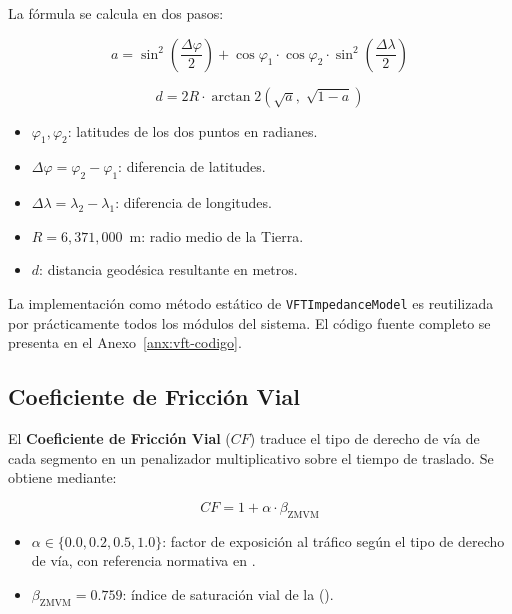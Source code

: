 La fórmula se calcula en dos pasos:

\begin{equation}
    a = \sin^{2}\!\left(\frac{\Delta\varphi}{2}\right)
        + \cos\varphi_1 \cdot \cos\varphi_2
          \cdot \sin^{2}\!\left(\frac{\Delta\lambda}{2}\right)
    \label{eq:haversine-a}
\end{equation}

\begin{equation}
    d = 2R \cdot \arctan2\!\left(\sqrt{a},\;\sqrt{1-a}\right)
    \label{eq:haversine-d}
\end{equation}

\begin{itemize}
    \item $\varphi_1, \varphi_2$: latitudes de los dos puntos en radianes.
    \item $\Delta\varphi = \varphi_2 - \varphi_1$: diferencia de latitudes.
    \item $\Delta\lambda = \lambda_2 - \lambda_1$: diferencia de longitudes.
    \item $R = 6{,}371{,}000$~m: radio medio de la Tierra.
    \item $d$: distancia geodésica resultante en metros.
\end{itemize}

La implementación como método estático de \texttt{VFTImpedanceModel} es reutilizada por prácticamente todos los módulos del sistema. El código fuente completo se presenta en el Anexo~\ref{anx:vft-codigo}.

\subsection{Coeficiente de Fricción Vial}
\label{subsec:vft-cf}

El \textbf{Coeficiente de Fricción Vial} ($CF$) traduce el tipo de derecho de
vía de cada segmento en un penalizador multiplicativo sobre el tiempo de
traslado. Se obtiene mediante:

\begin{equation}
    CF = 1 + \alpha \cdot \beta_{\text{ZMVM}}
    \label{eq:vft-cf}
\end{equation}

\begin{itemize}
    \item $\alpha \in \{0.0, 0.2, 0.5, 1.0\}$: factor de exposición al tráfico
    según el tipo de derecho de vía, con referencia normativa en
    \parencite{sedatu2019manual}.
    \item $\beta_{\text{ZMVM}} = 0.759$: índice de saturación vial de la
    \zmvm{} ().
\end{itemize}

